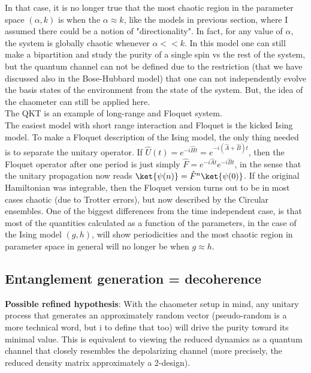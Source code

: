 In that case, it is no longer true that the most chaotic region in the parameter space $(\alpha,k)$ is when the $\alpha \approx k$, like the models in previous section, where I assumed there could be a notion of "directionality". In fact, for any value of $\alpha$, the system is globally chaotic whenever $\alpha <<k$. In this model one can still make a bipartition and study the purity of a single spin vs the rest of the system, but the quantum channel can not be defined due to the restriction (that we have discussed also in the Bose-Hubbard model) that one can not independently evolve the basis states of the environment from the state of the system. But, the idea of the chaometer can still be applied here.\\

The QKT is an example of long-range and Floquet system.\\

The easiest model with short range interaction and Floquet is the kicked Ising model. To make a Floquet description of the Ising model, the only thing needed is to separate the unitary operator. If $\hat{U}(t) = e^{-i\hat{H}t} = e^{-i(\hat{A}+ \hat{B})t}$, then the Floquet operator after one period is just simply $\hat{F} = e^{-i\hat{A}t}e^{-i\hat{B}t}$, in the sense that the unitary propagation now reads $\ket{\psi(n)} = \hat{F}^n\ket{\psi(0)}$. If the original Hamiltonian was integrable, then the Floquet version turns out to be in most cases chaotic (due to Trotter errors), but now described by the Circular ensembles. One of the biggest differences from the time independent case, is that most of the quantities calculated as a function of the parameters, in the case of the Ising model $(g,h)$, will show periodicities and the most chaotic region in parameter space in general will no longer be when $g\approx h$.\\

\subsection{Entanglement generation = decoherence}

\textbf{Possible refined hypothesis}: With the chaometer setup in mind, any unitary process that generates an approximately random vector (pseudo-random is a more technical word, but i to define that too) will drive the purity toward its minimal value. This is equivalent to viewing the reduced dynamics as a quantum channel that closely resembles the depolarizing channel (more precisely, the reduced density matrix approximately a 2-design).\\

